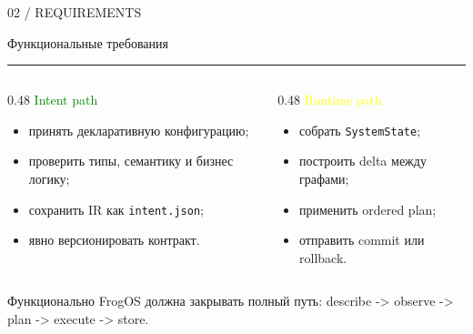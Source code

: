 \documentclass[aspectratio=169,10pt]{beamer}
\newcommand{\kicker}[1]{\textcolor{Muted}{\footnotesize\MakeUppercase{#1}}}
\newcommand{\slidehead}[2]{
  \vspace*{0.2cm}
  \kicker{#1}\par
  \vspace{0.1cm}
  {\usebeamerfont{frametitle}\textcolor{Text}{#2}}\par
  \vspace{0.18cm}
  {\color{Muted}\rule{\linewidth}{0.4pt}}
  \vspace{0.25cm}
}
\newcommand{\muted}[1]{\textcolor{Muted}{#1}}
\newcommand{\green}[1]{\textcolor{Green}{#1}}
\newcommand{\yellow}[1]{\textcolor{Yellow}{#1}}
\begin{document}
\begin{frame}{}
  \slidehead{02 / requirements}{Функциональные требования}

  \begin{columns}[T,totalwidth=\textwidth]
    \begin{column}{0.48\textwidth}
      \green{Intent path}
      \begin{itemize}
        \item принять декларативную конфигурацию;
        \item проверить типы, семантику и бизнес логику;
        \item сохранить IR как \texttt{intent.json};
        \item явно версионировать контракт.
      \end{itemize}
    \end{column}
    \begin{column}{0.48\textwidth}
      \yellow{Runtime path}
      \begin{itemize}
        \item собрать \texttt{SystemState};
        \item построить delta между графами;
        \item применить ordered plan;
        \item отправить commit или rollback.
      \end{itemize}
    \end{column}
  \end{columns}

  \vfill
  \muted{Функционально FrogOS должна закрывать полный путь: describe -> observe -> plan -> execute -> store.}
\end{frame}
\end{document}
